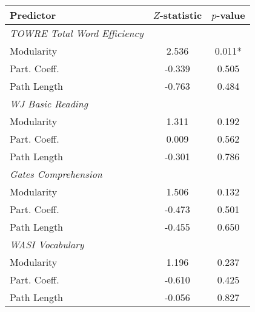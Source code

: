 \begin{tabular}{lcc}
\toprule
Predictor   &  $Z$-statistic &  $p$-value \\
\midrule
\textit{TOWRE Total Word Efficiency} & & \\
    \hspace{5pt}Modularity &  2.536 &  0.011* \\
    \hspace{5pt}Part. Coeff. & -0.339 &  0.505 \\
    \hspace{5pt}Path Length & -0.763 &  0.484 \\
\textit{WJ Basic Reading} & & \\
    \hspace{5pt}Modularity &  1.311 &  0.192 \\
    \hspace{5pt}Part. Coeff. &  0.009 &  0.562 \\
    \hspace{5pt}Path Length & -0.301 &  0.786 \\
\textit{Gates Comprehension}  & & \\
    \hspace{5pt}Modularity &  1.506 &  0.132 \\
    \hspace{5pt}Part. Coeff. & -0.473 &  0.501 \\
    \hspace{5pt}Path Length & -0.455 &  0.650 \\
\textit{WASI Vocabulary}  & & \\
    \hspace{5pt}Modularity &  1.196 &  0.237 \\
    \hspace{5pt}Part. Coeff. & -0.610 &  0.425 \\
    \hspace{5pt}Path Length & -0.056 &  0.827 \\
\bottomrule
\end{tabular}